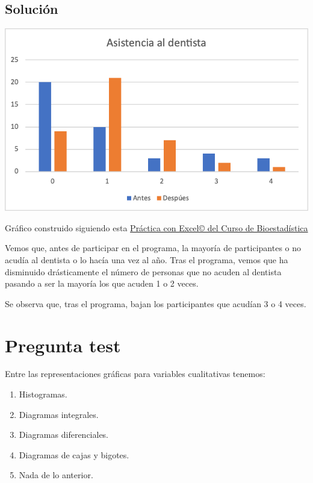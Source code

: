\documentclass[
]{book}
\providecommand{\tightlist}{%
  \setlength{\itemsep}{0pt}\setlength{\parskip}{0pt}}
\begin{document}
\hypertarget{soluciuxf3n-5}{%
\subsection{Solución}\label{soluciuxf3n-5}}

\includegraphics[width=10.03in]{img/2_3}

Gráfico construido siguiendo esta \href{https://1fjmanzano.github.io/bioestadistica/diagramas-de-barras-y-sectores.html}{Práctica con Excel© del Curso de Bioestadística}

Vemos que, antes de participar en el programa, la mayoría de participantes o no acudía al dentista o lo hacía una vez al año. Tras el programa, vemos que ha disminuido drásticamente el número de personas que no acuden al dentista pasando a ser la mayoría los que acuden 1 o 2 veces.

Se observa que, tras el programa, bajan los participantes que acudían 3 o 4 veces.

\hypertarget{pregunta-test-44}{%
\section{Pregunta test}\label{pregunta-test-44}}

Entre las representaciones gráficas para variables cualitativas tenemos:

\begin{enumerate}
\def\labelenumi{\alph{enumi})}
\tightlist
\item
  Histogramas.
\item
  Diagramas integrales.
\item
  Diagramas diferenciales.
\item
  Diagramas de cajas y bigotes.
\item
  Nada de lo anterior.
\end{enumerate}
\end{document}

